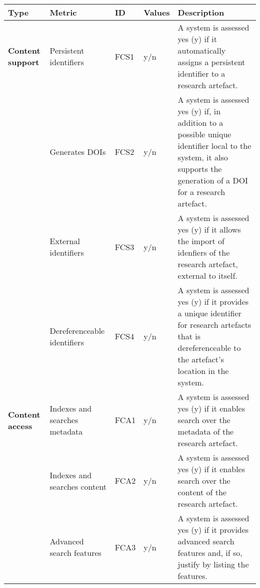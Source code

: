 \begin{tabular}
\end{tabular}


\begin{tabular}{|m{2.5cm}|m{3cm}|m{1cm}|m{1cm}|p{8cm}|}
\hline \textbf{Type}&\textbf{Metric}&\textbf{ID}&\textbf{Values}&\textbf{Description}\\ \hline
\textbf{Content support}&Persistent identifiers&FCS1&y/n&A system is assessed yes (y) if it automatically assigns a persistent identifier to a research artefact.\\ \hline
\textbf{}&Generates DOIs&FCS2&y/n&A system is assessed yes (y) if, in addition to a possible unique identifier local to the system, it also supports the generation of a DOI for a research artefact.\\ \hline
\textbf{}&External identifiers&FCS3&y/n&A system is assessed yes (y) if it allows the import of idenfiers of the research artefact, external to itself.\\ \hline
\textbf{}&Dereferenceable identifiers&FCS4&y/n&A system is assessed yes (y) if it provides a unique identifier for research artefacts that is dereferenceable to the artefact's location in the system.\\ \hline
\textbf{Content access}&Indexes and searches metadata&FCA1&y/n&A system is assessed yes (y) if it enables search over the metadata of the research artefact.\\ \hline
\textbf{}&Indexes and searches content&FCA2&y/n&A system is assessed yes (y) if it enables search over the content of the research artefact.\\ \hline
\textbf{}&Advanced search features&FCA3&y/n&A system is assessed yes (y) if it provides advanced search features and, if so, justify by listing the features.\\ \hline
\end{tabular}


